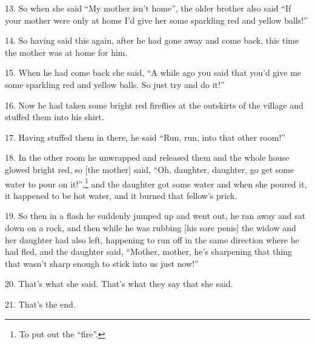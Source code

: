 13. So when she said ``My mother isn't home'', the older brother also said ``If
your mother were only at home I'd give her some sparkling red and yellow balls!''

14. So having said this again, after he had gone away and come back, this time the
mother was at home for him.

15. When he had come back she said, ``A while ago you said that you'd give me some
sparkling red and yellow balls. So just try and do it!''

16. Now he had taken some bright red fireflies at the outskirts of the village and
stuffed them into his shirt.

17. Having stuffed them in there, he said ``Run, run, into that other room!''

18. In the other room he unwrapped and released them and the whole house glowed
bright red, so [the mother] said, ``Oh, daughter, daughter, go get some water to
pour on it!'',\footnote{To put out the ``fire''.} and the daughter got some water and when she poured it, it happened
to be hot water, and it burned that fellow's prick.

19. So then in a flash he suddenly jumped up and went out, he ran away and sat down
on a rock, and then while he was rubbing [his sore penis] the widow and her daughter
had also left, happening to run off in the same direction where he had fled, and
the daughter said, ``Mother, mother, he's sharpening that thing that wasn't sharp
enough to stick into us just now!''

20. That's what she said. That's what they say that she said.

21. That's the end.

